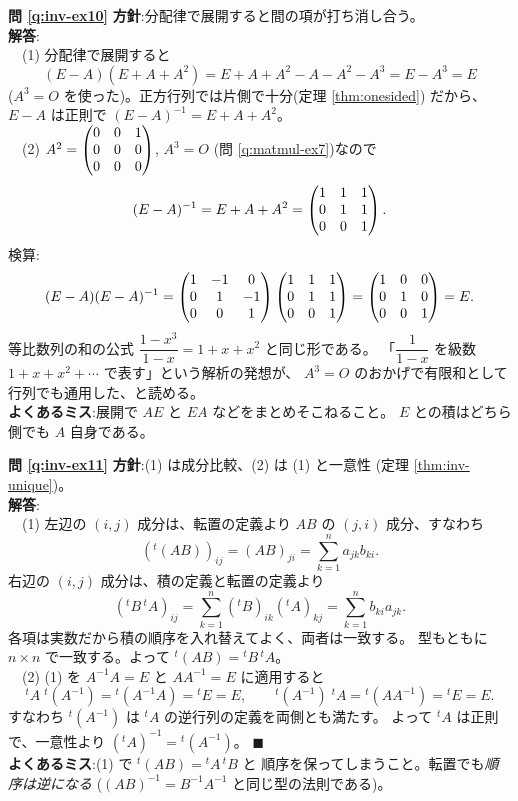 \bigskip
\noindent\textbf{問 \ref{q:inv-ex10}}\quad
\textbf{方針}:分配律で展開すると間の項が打ち消し合う。\\
\textbf{解答}:\\
　(1) 分配律で展開すると
\[
(E - A)(E + A + A^2) = E + A + A^2 - A - A^2 - A^3 = E - A^3 = E
\]
($A^3 = O$ を使った)。正方行列では片側で十分(定理 \ref{thm:onesided})
だから、$E - A$ は正則で $(E - A)^{-1} = E + A + A^2$。\\
　(2) $A^2 = \begin{pmatrix}0 & 0 & 1 \\ 0 & 0 & 0 \\ 0 & 0 & 0\end{pmatrix}$, $A^3 = O$
(問 \ref{q:matmul-ex7})なので
\[
(E - A)^{-1} = E + A + A^2 = \begin{pmatrix}1 & 1 & 1 \\ 0 & 1 & 1 \\ 0 & 0 & 1\end{pmatrix}.
\]
検算:
\[
(E - A)(E - A)^{-1}
= \begin{pmatrix}1 & -1 & 0 \\ 0 & 1 & -1 \\ 0 & 0 & 1\end{pmatrix}
\begin{pmatrix}1 & 1 & 1 \\ 0 & 1 & 1 \\ 0 & 0 & 1\end{pmatrix}
= \begin{pmatrix}1 & 0 & 0 \\ 0 & 1 & 0 \\ 0 & 0 & 1\end{pmatrix} = E.
\]
等比数列の和の公式 $\dfrac{1 - x^3}{1 - x} = 1 + x + x^2$ と同じ形である。
「$\dfrac{1}{1 - x}$ を級数 $1 + x + x^2 + \cdots$ で表す」という解析の発想が、
$A^3 = O$ のおかげで有限和として行列でも通用した、と読める。\\
\textbf{よくあるミス}:展開で $AE$ と $EA$ などをまとめそこねること。
$E$ との積はどちら側でも $A$ 自身である。

\bigskip
\noindent\textbf{問 \ref{q:inv-ex11}}\quad
\textbf{方針}:(1) は成分比較、(2) は (1) と一意性
(定理 \ref{thm:inv-unique})。\\
\textbf{解答}:\\
　(1) 左辺の $(i,j)$ 成分は、転置の定義より $AB$ の
$(j,i)$ 成分、すなわち
\[
({}^t(AB))_{ij} = (AB)_{ji} = \sum_{k=1}^{n} a_{jk} b_{ki}.
\]
右辺の $(i,j)$ 成分は、積の定義と転置の定義より
\[
({}^t\!B\,{}^t\!A)_{ij} = \sum_{k=1}^{n} ({}^t\!B)_{ik}({}^t\!A)_{kj}
= \sum_{k=1}^{n} b_{ki} a_{jk}.
\]
各項は実数だから積の順序を入れ替えてよく、両者は一致する。
型もともに $n \times n$ で一致する。よって ${}^t(AB) = {}^t\!B\,{}^t\!A$。\\
　(2) (1) を $A^{-1}A = E$ と $AA^{-1} = E$ に適用すると
\[
{}^t\!A\;{}^t(A^{-1}) = {}^t(A^{-1}A) = {}^t E = E,
\qquad
{}^t(A^{-1})\;{}^t\!A = {}^t(AA^{-1}) = {}^t E = E.
\]
すなわち ${}^t(A^{-1})$ は ${}^t\!A$ の逆行列の定義を両側とも満たす。
よって ${}^t\!A$ は正則で、一意性より $({}^t\!A)^{-1} = {}^t(A^{-1})$。
$\blacksquare$\\
\textbf{よくあるミス}:(1) で ${}^t(AB) = {}^t\!A\,{}^t\!B$ と
順序を保ってしまうこと。転置でも\emph{順序は逆になる}
($(AB)^{-1} = B^{-1}A^{-1}$ と同じ型の法則である)。

